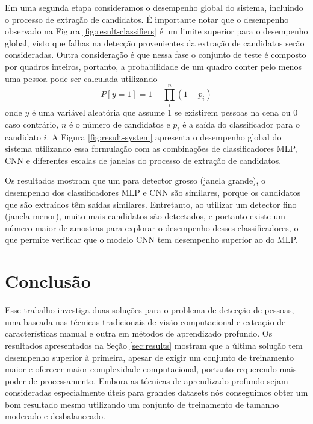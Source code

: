     Em uma segunda etapa consideramos o desempenho global do sistema, incluindo o processo de extração de candidatos. É importante notar que o desempenho observado na Figura \ref{fig:result-classifiers} é um limite superior para o desempenho global, visto que falhas na detecção provenientes da extração de candidatos serão consideradas. Outra consideração é que nessa fase o conjunto de teste é composto por quadros inteiros, portanto, a probabilidade de um quadro conter pelo menos uma pessoa pode ser calculada utilizando
    \begin{equation}
    P[y=1] = 1 - \prod_i^n (1-p_i)
    \end{equation}
    onde $y$ é uma variável aleatória que assume 1 se existirem pessoas na cena ou 0 caso contrário, $n$ é o número de candidatos e $p_i$ é a saída do classificador para o candidato $i$. A Figura \ref{fig:result-system} apresenta o desempenho global do sistema utilizando essa formulação com as combinações de classificadores MLP, CNN e diferentes escalas de janelas do processo de extração de candidatos.

    Os resultados mostram que um para detector grosso (janela grande), o desempenho dos classificadores MLP e CNN são similares, porque os candidatos que são extraídos têm saídas similares. Entretanto, ao utilizar um detector fino (janela menor), muito mais candidatos são detectados, e portanto existe um número maior de amostras para explorar o desempenho desses classificadores, o que permite verificar que o modelo CNN tem desempenho superior ao do MLP.

    \begin{figure*}[!t]
    \centering
    \label{fig:result-system-all}
    \hfil
    \label{fig:result-system-all-zoom}
    \caption{Desempenho global do sistema.}
    \label{fig:result-system}
    \end{figure*}

\section{Conclusão}
\label{sec:conclusion}

    Esse trabalho investiga duas soluções para o problema de detecção de pessoas, uma baseada nas técnicas tradicionais de visão computacional e extração de características manual e outra em métodos de aprendizado profundo. Os resultados apresentados na Seção \ref{sec:results} mostram que a última solução tem desempenho superior à primeira, apesar de exigir um conjunto de treinamento maior e oferecer maior complexidade computacional, portanto requerendo mais poder de processamento. Embora as técnicas de aprendizado profundo sejam consideradas especialmente úteis para grandes datasets nós conseguimos obter um bom resultado mesmo utilizando um conjunto de treinamento de tamanho moderado e desbalanceado.


